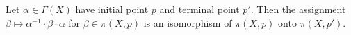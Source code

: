 Let $\alpha \in \Gamma(X)$ have initial point $p$ and terminal point $p'$. Then the assignment $\beta \mapsto \alpha^{-1} \cdot \beta \cdot \alpha$ for $\beta \in \pi(X,p)$ is an isomorphism of $\pi(X,p)$ onto $\pi(X,p')$.
